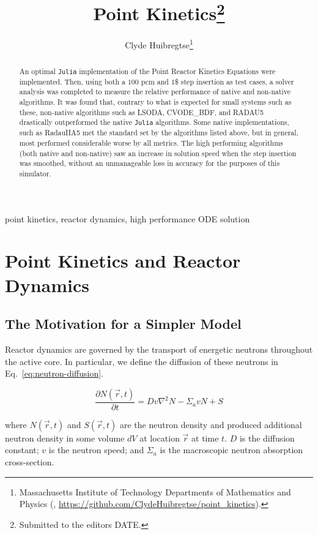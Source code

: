 \documentclass[review,onefignum,onetabnum]{siamart171218}
\title{Point Kinetics\thanks{Submitted to the editors DATE.}}
\author{Clyde Huibregtse\thanks{Massachusetts Institute of Technology Departments of Mathematics and Physics
  (\email{huibregc@mit.edu}, \url{https://github.com/ClydeHuibregtse/point_kinetics}).}}
\begin{document}
\maketitle

\begin{abstract}
An optimal \texttt{Julia} implementation of the Point Reactor Kinetics Equations
were implemented. Then, using both a $100$ pcm and $1$\$ step insertion as test
cases, a solver analysis was completed to measure the relative performance of native
and non-native algorithms. It was found that, contrary to what is expected for small
systems such as these, non-native algorithms such as LSODA, CVODE\_BDF, and RADAU5
drastically outperformed the native \texttt{Julia} algorithms. Some native implementations,
such as RadauIIA5 met the standard set by the algorithms listed above, but in general,
most performed considerable worse by all metrics. The high performing algorithms (both
native and non-native) saw an increase in solution speed when the step insertion was
smoothed, without an unmanageable loss in accuracy for the purposes of this simulator.
\end{abstract}

\begin{keywords}
  point kinetics, reactor dynamics, high performance ODE solution
\end{keywords}


\section{Point Kinetics and Reactor Dynamics}

\subsection{The Motivation for a Simpler Model}
Reactor dynamics are governed by the transport of energetic neutrons
throughout the active core. In particular, we define the diffusion
of these neutrons in Eq.~\cref{eq:neutron-diffusion}.

\begin{equation}
  \label{eq:neutron-diffusion}
  \frac{\partial N(\vec{r}, t)}{\partial t} = Dv\nabla^2N - \Sigma_a v N + S
\end{equation}

where $N(\vec{r}, t)$ and $S(\vec{r}, t)$ are the neutron density and produced
additional neutron density in some volume $dV$ at location
$\vec{r}$ at time $t$.  $D$ is the diffusion constant; $v$ is the neutron
speed; and $\Sigma_a$ is the macroscopic neutron absorption cross-section.\cite{Dynamics} \\
\end{document}
